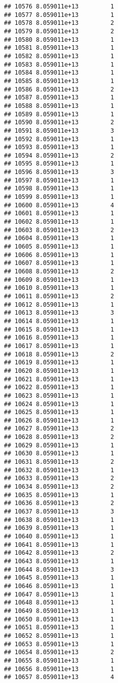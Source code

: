 \documentclass[
]{article}
\begin{document}
\begin{verbatim}
## 10576 8.059011e+13         1
## 10577 8.059011e+13         1
## 10578 8.059011e+13         2
## 10579 8.059011e+13         2
## 10580 8.059011e+13         1
## 10581 8.059011e+13         1
## 10582 8.059011e+13         1
## 10583 8.059011e+13         1
## 10584 8.059011e+13         1
## 10585 8.059011e+13         1
## 10586 8.059011e+13         2
## 10587 8.059011e+13         1
## 10588 8.059011e+13         1
## 10589 8.059011e+13         1
## 10590 8.059011e+13         2
## 10591 8.059011e+13         3
## 10592 8.059011e+13         1
## 10593 8.059011e+13         1
## 10594 8.059011e+13         2
## 10595 8.059011e+13         1
## 10596 8.059011e+13         3
## 10597 8.059011e+13         1
## 10598 8.059011e+13         1
## 10599 8.059011e+13         1
## 10600 8.059011e+13         4
## 10601 8.059011e+13         1
## 10602 8.059011e+13         1
## 10603 8.059011e+13         2
## 10604 8.059011e+13         1
## 10605 8.059011e+13         1
## 10606 8.059011e+13         1
## 10607 8.059011e+13         1
## 10608 8.059011e+13         2
## 10609 8.059011e+13         1
## 10610 8.059011e+13         1
## 10611 8.059011e+13         2
## 10612 8.059011e+13         1
## 10613 8.059011e+13         3
## 10614 8.059011e+13         1
## 10615 8.059011e+13         1
## 10616 8.059011e+13         1
## 10617 8.059011e+13         1
## 10618 8.059011e+13         2
## 10619 8.059011e+13         1
## 10620 8.059011e+13         1
## 10621 8.059011e+13         1
## 10622 8.059011e+13         1
## 10623 8.059011e+13         1
## 10624 8.059011e+13         1
## 10625 8.059011e+13         1
## 10626 8.059011e+13         1
## 10627 8.059011e+13         2
## 10628 8.059011e+13         2
## 10629 8.059011e+13         1
## 10630 8.059011e+13         1
## 10631 8.059011e+13         2
## 10632 8.059011e+13         1
## 10633 8.059011e+13         2
## 10634 8.059011e+13         2
## 10635 8.059011e+13         1
## 10636 8.059011e+13         2
## 10637 8.059011e+13         3
## 10638 8.059011e+13         1
## 10639 8.059011e+13         1
## 10640 8.059011e+13         1
## 10641 8.059011e+13         1
## 10642 8.059011e+13         2
## 10643 8.059011e+13         1
## 10644 8.059011e+13         3
## 10645 8.059011e+13         1
## 10646 8.059011e+13         1
## 10647 8.059011e+13         1
## 10648 8.059011e+13         1
## 10649 8.059011e+13         1
## 10650 8.059011e+13         1
## 10651 8.059011e+13         1
## 10652 8.059011e+13         1
## 10653 8.059011e+13         1
## 10654 8.059011e+13         2
## 10655 8.059011e+13         1
## 10656 8.059011e+13         1
## 10657 8.059011e+13         4

\end{verbatim}
\end{document}
